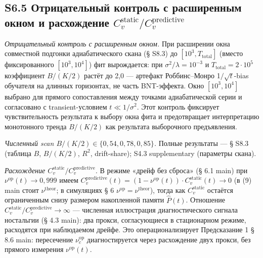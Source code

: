 \documentclass[pdflatex,sn-mathphys-ay]{sn-jnl}
\begin{document}
\subsection*{\texorpdfstring{S6.5 Отрицательный контроль с расширенным окном и расхождение \(C_v^{\text{static}}/C_v^{\text{predictive}}\)}{S6.5 Отрицательный контроль с расширенным окном и расхождение C\_v\^{}\{\textbackslash text\{static\}\}/C\_v\^{}\{\textbackslash text\{predictive\}\}}}\label{s6.5-ux43eux442ux440ux438ux446ux430ux442ux435ux43bux44cux43dux44bux439-ux43aux43eux43dux442ux440ux43eux43bux44c-ux441-ux440ux430ux441ux448ux438ux440ux435ux43dux43dux44bux43c-ux43eux43aux43dux43eux43c-ux438-ux440ux430ux441ux445ux43eux436ux434ux435ux43dux438ux435-c_vtextstaticc_vtextpredictive}



\emph{Отрицательный контроль с расширенным окном.} При расширении окна совместной подгонки адиабатического скана (§ S8.3) до \([10^3, T_{\text{total}}]\) (вместо фиксированного \([10^3, 10^4]\)) фит вырождается: при \(\sigma^2/\lambda = 10^{-3}\) и \(T_{\text{total}} = 2\cdot 10^5\) коэффициент \(B/(K/2)\) растёт до 2,0 --- артефакт Роббинс--Монро 1\(/\sqrt t\)-bias обучателя на длинных горизонтах, не часть BNT-эффекта. Окно \([10^3, 10^4]\) выбрано для прямого сопоставления между точками адиабатической серии и согласовано с transient-условием \(t \ll 1/\sigma^2\). Этот контроль фиксирует чувствительность результата к выбору окна фита и предотвращает интерпретацию монотонного тренда \(B/(K/2)\) как результата выборочного предъявления.



\emph{Численный scan \(B/(K/2) \in \{0{,}54, 0{,}78, 0{,}85\}\).} Полные результаты --- § S8.3 (таблица \(B\), \(B/(K/2)\), \(R^2\), drift-share); S4.3 supplementary (параметры скана).



\emph{Расхождение \(C_v^{\text{static}}/C_v^{\text{predictive}}\).} В режиме «дрейф без сброса» (§ 6.1 main) при \(\nu^{\text{op}}(t) \to 0{,}999\) имеем \(C_v^{\text{predictive}}(t) = (1 - \nu^{\text{op}}(t)) \cdot C_v^{\text{static}}(t) \to 0\) (в (9) main стоит \(\nu^{\text{theor}}\); в симуляциях § 6 \(\nu^{\text{op}} = \nu^{\text{theor}}\)), тогда как \(C_v^{\text{static}}\) остаётся ограниченным снизу размером накопленной памяти \(\hat P(t)\). Отношение \(C_v^{\text{static}}/ C_v^{\text{predictive}} \to \infty\) --- численная иллюстрация диагностического сигнала ностальгии (§ 4.3 main): два прокси, согласующиеся в стационарном режиме, расходятся при наблюдаемом дрейфе. Это операционализирует Предсказание 1 § 8.6 main: пересечение \(\nu_c^{\text{op}}\) диагностируется через расхождение двух прокси, без прямого измерения \(\nu^{\text{op}}(t)\).
\end{document}

